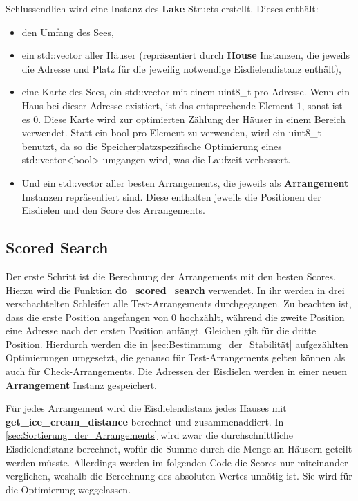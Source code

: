 \documentclass[a4paper,10pt,ngerman]{scrartcl}
\begin{document}
Schlussendlich wird eine Instanz des \textbf{Lake} Structs erstellt.
Dieses enthält:
\begin{itemize}
    \item den Umfang des Sees,
    \item ein std::vector aller Häuser (repräsentiert durch \textbf{House} Instanzen, die jeweils die Adresse und Platz für die jeweilig notwendige Eisdielendistanz enthält),
    \item eine Karte des Sees, ein std::vector mit einem uint8\_t pro Adresse.
          Wenn ein Haus bei dieser Adresse existiert, ist das entsprechende Element $1$, sonst ist es $0$.
          Diese Karte wird zur optimierten Zählung der Häuser in einem Bereich verwendet.
          Statt ein bool pro Element zu verwenden, wird ein uint8\_t benutzt, da so die Speicherplatzspezifische Optimierung eines std::vector<bool> umgangen wird, was die Laufzeit verbessert.
    \item Und ein std::vector aller besten Arrangements, die jeweils als \textbf{Arrangement} Instanzen repräsentiert sind.
          Diese enthalten jeweils die Positionen der Eisdielen und den Score des Arrangements.
\end{itemize}

\subsection{Scored Search}
\label{sec:Scored_Search}
Der erste Schritt ist die Berechnung der Arrangements mit den besten Scores.
Hierzu wird die Funktion \textbf{do\_scored\_search} verwendet.
In ihr werden in drei verschachtelten Schleifen alle Test-Arrangements durchgegangen.
Zu beachten ist, dass die erste Position angefangen von $0$ hochzählt, während die zweite Position eine Adresse nach der ersten Position anfängt.
Gleichen gilt für die dritte Position.
Hierdurch werden die in \autoref{sec:Bestimmung_der_Stabilität} aufgezählten Optimierungen umgesetzt, die genauso für Test-Arrangements gelten können als auch für Check-Arrangements.
Die Adressen der Eisdielen werden in einer neuen \textbf{Arrangement} Instanz gespeichert.

Für jedes Arrangement wird die Eisdielendistanz jedes Hauses mit \textbf{get\_ice\_cream\_distance} berechnet und zusammenaddiert.
In \autoref{sec:Sortierung_der_Arrangements} wird zwar die durchschnittliche Eisdielendistanz berechnet, wofür die Summe durch die Menge an Häusern geteilt werden müsste.
Allerdings werden im folgenden Code die Scores nur miteinander verglichen, weshalb die Berechnung des absoluten Wertes unnötig ist.
Sie wird für die Optimierung weggelassen.
\end{document}
